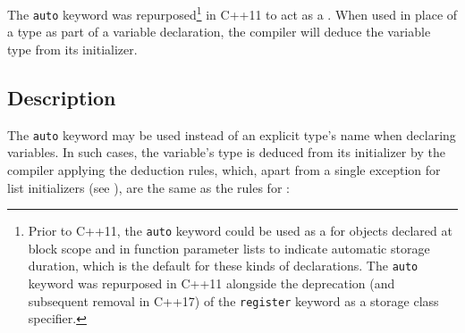 



\label{auto-variables}
\label{auto-feature}
\setcounter{table}{0}
\setcounter{footnote}{0}
\setcounter{lstlisting}{0}

The \lstinline!auto! keyword was repurposed{\cprotect\footnote{Prior to
C++11, the \lstinline!auto! keyword could be used as a  for objects declared at block scope and in function
parameter lists to indicate automatic storage duration, which is the
default for these kinds of declarations. The \lstinline!auto! keyword was
repurposed in C++11 alongside the deprecation (and subsequent removal
in C++17) of the \lstinline!register! keyword as a storage class
  specifier.}} in C++11 to act as a . When used
in place of a type as part of a variable declaration, the compiler will
deduce the variable type from its initializer.

\subsection[Description]{Description}\label{description}

The \lstinline!auto! keyword may be used instead of an explicit type's name
when declaring variables. In such cases, the variable's type is deduced
from its initializer by the compiler applying the  deduction rules, which, apart from a single exception for list
initializers (see ),
are the same as the rules for :

